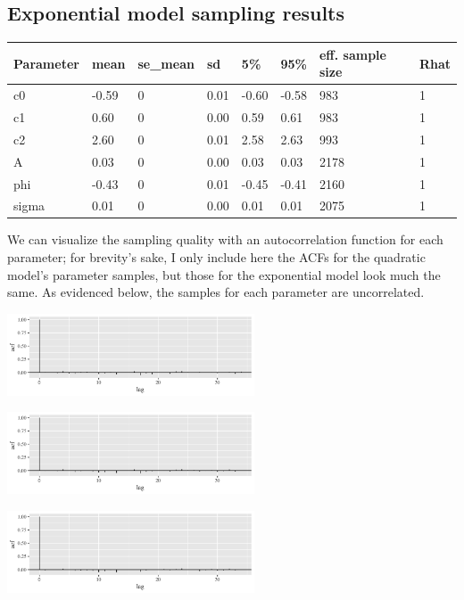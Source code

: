 \documentclass[]{article}
\let\origfigure=\figure
\let\endorigfigure=\endfigure
\renewenvironment{figure}[1][]{%
  \origfigure[H]
}{%
  \endorigfigure
}
\begin{document}
\hypertarget{exponential-model-sampling-results}{%
\subsection{Exponential model sampling
results}\label{exponential-model-sampling-results}}

\begin{longtable}[]{@{}llllllll@{}}
\toprule
Parameter & mean & se\_mean & sd & 5\% & 95\% & eff. sample size &
Rhat\tabularnewline
\midrule
\endhead
c0 & -0.59 & 0 & 0.01 & -0.60 & -0.58 & 983 & 1\tabularnewline
c1 & 0.60 & 0 & 0.00 & 0.59 & 0.61 & 983 & 1\tabularnewline
c2 & 2.60 & 0 & 0.01 & 2.58 & 2.63 & 993 & 1\tabularnewline
A & 0.03 & 0 & 0.00 & 0.03 & 0.03 & 2178 & 1\tabularnewline
phi & -0.43 & 0 & 0.01 & -0.45 & -0.41 & 2160 & 1\tabularnewline
sigma & 0.01 & 0 & 0.00 & 0.01 & 0.01 & 2075 & 1\tabularnewline
\bottomrule
\end{longtable}

We can visualize the sampling quality with an autocorrelation function
for each parameter; for brevity's sake, I only include here the ACFs for
the quadratic model's parameter samples, but those for the exponential
model look much the same. As evidenced below, the samples for each
parameter are uncorrelated.

\begin{figure}
\centering
\includegraphics[width=0.55\textwidth]{mauna_loa/auto1.png}
\caption{Autocorrelation of c0 samples}
\end{figure}

\begin{figure}
\centering
\includegraphics[width=0.55\textwidth]{mauna_loa/auto2.png}
\caption{Autocorrelation of c1 samples}
\end{figure}

\begin{figure}
\centering
\includegraphics[width=0.55\textwidth]{mauna_loa/auto3.png}
\caption{Autocorrelation of c2 samples}
\end{figure}
\end{document}
